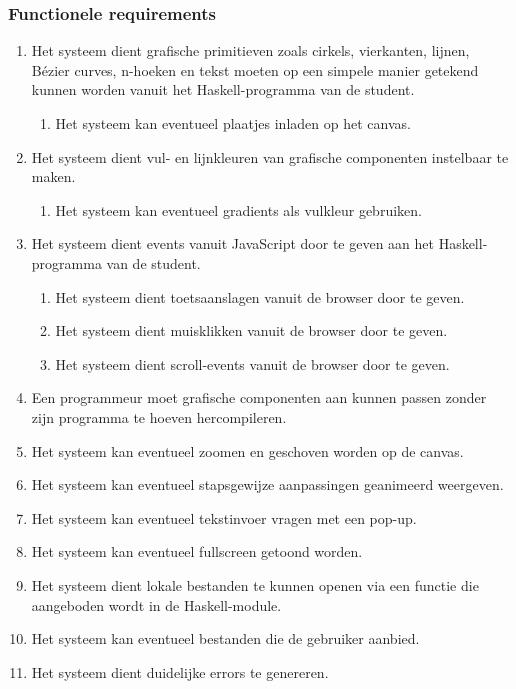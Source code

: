 \subsubsection{Functionele requirements}
\begin{enumerate}[{R}1]
	\item Het systeem dient grafische primitieven zoals cirkels, vierkanten, lijnen, Bézier curves, n-hoeken en tekst moeten op een simpele manier getekend kunnen worden vanuit het Haskell-programma van de student.
	\begin{enumerate}[{R1.}1]
		\item Het systeem kan eventueel plaatjes inladen op het canvas.
	\end{enumerate}
	\item Het systeem dient vul- en lijnkleuren van grafische componenten instelbaar te maken.
	\begin{enumerate}[{R2.}1]
		\item Het systeem kan eventueel gradients als vulkleur gebruiken.
	\end{enumerate}
	\item Het systeem dient events vanuit JavaScript door te geven aan het Haskell-programma van de student.
	\begin{enumerate}[{R3.}1]
		\item Het systeem dient toetsaanslagen vanuit de browser door te geven.
		\item Het systeem dient muisklikken vanuit de browser door te geven.
		\item Het systeem dient scroll-events vanuit de browser door te geven.
	\end{enumerate}
	\item Een programmeur moet grafische componenten aan kunnen passen zonder zijn programma te hoeven hercompileren.
	\item Het systeem kan eventueel zoomen en geschoven worden op de canvas.
	\item Het systeem kan eventueel stapsgewijze aanpassingen geanimeerd weergeven.
	\item Het systeem kan eventueel tekstinvoer vragen met een pop-up.
	\item Het systeem kan eventueel fullscreen getoond worden.
	\item Het systeem dient lokale bestanden te kunnen openen via een functie die aangeboden wordt in de Haskell-module.
	\item Het systeem kan eventueel bestanden die de gebruiker aanbied.
	\item Het systeem dient duidelijke errors te genereren.

\end{enumerate}
